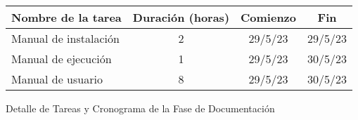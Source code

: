 \begin{planificacion}
	\centering
	\begin{tabular}{ | m{9cm} | c | c | c | }
		\hline
		\textbf{Nombre de la tarea} & \textbf{Duración (horas)} & \textbf{Comienzo} & \textbf{Fin} \\\hline
		Manual de instalación       & 2                         & 29/5/23           & 29/5/23      \\\hline
		Manual de ejecución         & 1                         & 29/5/23           & 30/5/23      \\\hline
		Manual de usuario           & 8                         & 29/5/23           & 30/5/23      \\\hline
	\end{tabular}
	\caption{Detalle de Tareas y Cronograma de la Fase de Documentación}
\end{planificacion}
